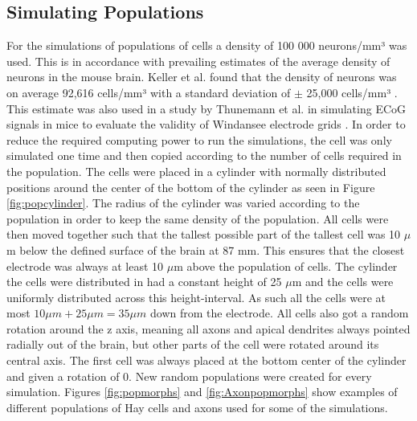 \documentclass[final, a4paper,masters,en,listoffigures,listoftables,norwegiandates]{NMBU}
\begin{document}
\subsection{Simulating Populations}\label{subsec:populationMethod}
For the simulations of populations of cells a density of 100 000 neurons/mm³ was used. This is in accordance with prevailing estimates of the average density of neurons in the mouse brain. Keller et al. found that the density of neurons was on average 92,616 cells/mm³ with a standard deviation of $\pm$ 25,000 cells/mm³ \cite{Keller2018densities}. This estimate was also used in a study by Thunemann et al. in simulating ECoG signals in mice to evaluate the validity of Windansee electrode grids \cite{Thunemann2022Windansee}.
In order to reduce the required computing power to run the simulations, the cell was only simulated one time and then copied according to the number of cells required in the population. The cells were placed in a cylinder with normally distributed positions around the center of the bottom of the cylinder as seen in Figure \ref{fig:popcylinder}. The radius of the cylinder was varied according to the population in order to keep the same density of the population. 
\newline
All cells were then moved together such that the tallest possible part of the tallest cell was 10 $\mu$m below the defined surface of the brain at 87 mm. This ensures that the closest electrode was always at least 10 $\mu$m above the population of cells. The cylinder the cells were distributed in had a constant height of 25 $\mu$m and the cells were uniformly distributed across this height-interval. As such all the cells were at most $10 \mu m + 25\mu m= 35\mu m$ down from the electrode. All cells also got a random rotation around the z axis, meaning all axons and apical dendrites always pointed radially out of the brain, but other parts of the cell were rotated around its central axis. The first cell was always placed at the bottom center of the cylinder and given a rotation of 0. New random populations were created for every simulation. Figures \ref{fig:popmorphs} and \ref{fig:Axonpopmorphs} show examples of different populations of Hay cells and axons used for some of the simulations.
\end{document}
